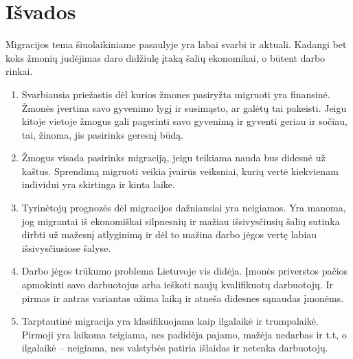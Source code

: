 \documentclass[11pt, titlepage]{article}
\begin{document}
\section{Išvados}

	Migracijos tema šiuolaikiniame pasaulyje yra labai svarbi ir aktuali. Kadangi bet koks žmonių judėjimas daro didžiulę įtaką šalių ekonomikai, o būtent darbo rinkai.


\begin{enumerate}
\item Svarbiausia priežastis dėl kurios žmones pasiryžta migruoti yra finansinė. Žmonės įvertina savo gyvenimo lygį ir susimąsto, ar galėtų tai pakeisti. Jeigu kitoje vietoje žmogus gali pagerinti savo gyvenimą ir gyventi geriau ir sočiau, tai, žinoma, jis pasirinks geresnį būdą.
\item Žmogus visada pasirinks migraciją, jeigu teikiama nauda bus didesnė už kaštus. Sprendimą migruoti veikia įvairūs veiksniai, kurių vertė kiekvienam individui yra skirtinga ir kinta laike.
\item Tyrinėtojų prognozės dėl migracijos dažniausiai yra neigiamos. Yra manoma, jog migrantai iš ekonomiškai silpnesnių ir mažiau išsivysčiusių šalių sutinka dirbti už mažesnį atlyginimą ir dėl to mažina darbo jėgos vertę labiau išsivysčiusiose šalyse.
\item Darbo jėgos trūkumo problema Lietuvoje vis didėja. Įmonės priverstos pačios apmokinti savo darbuotojus arba ieškoti naujų kvalifikuotų darbuotojų. Ir pirmas ir antras variantas užima laiką ir atneša didesnes sąnaudas įmonėms. 
\item Tarptautinė migracija yra klasifikuojama kaip ilgalaikė ir trumpalaikė. Pirmoji yra laikoma teigiama, nes padidėja pajamo, mažėja nedarbas ir t.t, o ilgalaikė – neigiama, nes valstybės patiria išlaidas ir netenka darbuotojų.

\end{enumerate}

\newpage
\nocite{*}
\printbibliography[title= Literatūros sąrašas]
\end{document}
